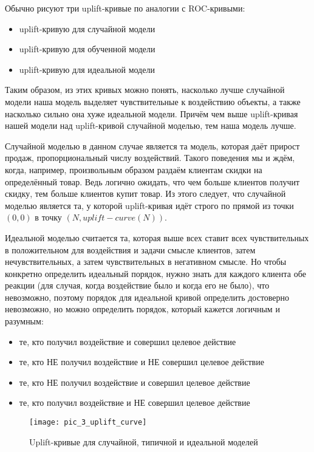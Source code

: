 Обычно рисуют три uplift-кривые по аналогии с ROC-кривыми:
\begin{itemize}
    \item uplift-кривую для случайной модели
    \item uplift-кривую для обученной модели
    \item uplift-кривую для идеальной модели
\end{itemize}

Таким образом, из этих кривых можно понять, насколько лучше случайной модели наша модель выделяет чувствительные к воздействию объекты, а также насколько сильно она хуже идеальной модели. Причём чем выше uplift-кривая нашей модели над uplift-кривой случайной моделью, тем наша модель лучше.

Случайной моделью в данном случае является та модель, которая даёт прирост продаж, пропорциональный числу воздействий. Такого поведения мы и ждём, когда, например, произвольным образом раздаём клиентам скидки на определённый товар. Ведь логично ожидать, что чем больше клиентов получит скидку, тем больше клиентов купит товар. Из этого следует, что случайной моделью является та, у которой uplift-кривая идёт строго по прямой из точки $(0,0)$ в точку $(N, uplift-curve(N))$.

Идеальной моделью считается та, которая выше всех ставит всех чувствительных в положительном для воздействия и задачи смысле клиентов, затем нечувствительных, а затем чувствительных в негативном смысле. Но чтобы конкретно определить идеальный порядок, нужно знать для каждого клиента обе реакции (для случая, когда воздействие было и когда его не было), что невозможно, поэтому порядок для идеальной кривой определить достоверно невозможно, но можно определить порядок, который кажется логичным и разумным:
\begin{itemize}
    \item те, кто получил воздействие и совершил целевое действие
    \item те, кто НЕ получил воздействие и НЕ совершил целевое действие
    \item те, кто НЕ получил воздействие и совершил целевое действие
    \item те, кто получил воздействие и НЕ совершил целевое действие
\end{itemize}

\begin{figure}[ht]
\centering
\texttt{[image: pic\_3\_uplift\_curve]}
\centering
\caption{Uplift-кривые для случайной, типичной и идеальной моделей}
\label{fig:pic_3_uplift_curve}
\end{figure}


